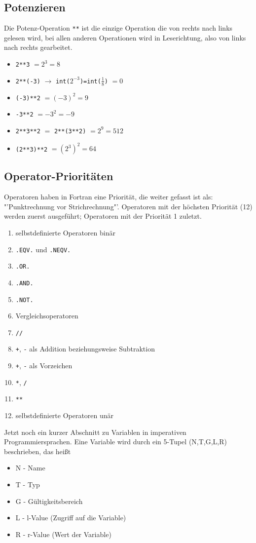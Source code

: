 \subsection{Potenzieren}

Die Potenz-Operation \texttt{**} ist die einzige Operation die von rechts nach links gelesen wird, bei allen anderen Operationen wird in Leserichtung, also von links nach rechts gearbeitet.
\begin{itemize}
	\item\texttt{2**3} $=2^3=8$
	\item\texttt{2**(-3)} $\to$ \texttt{int($2^{-3}$)=int($\frac{1}{8}$)} $=0$
	\item\texttt{(-3)**2} $=(-3)^2=9$
	\item\texttt{-3**2} $=-3^2=-9$
	\item\texttt{2**3**2} $=$ \texttt{2**(3**2)} $=2^9=512$
	\item\texttt{(2**3)**2} $=(2^3)^2=64$
\end{itemize}

\subsection{Operator-Prioritäten}

Operatoren haben in Fortran eine Priorität, die weiter gefasst ist als: "'Punktrechnung vor Strichrechnung"'. Operatoren mit der höchsten Priorität (12) werden zuerst ausgeführt; Operatoren mit der Priorität 1 zuletzt.
\begin{enumerate}
	\item selbstdefinierte Operatoren binär
	\item\texttt{.EQV.} und \texttt{.NEQV.}
	\item\texttt{.OR.}
	\item\texttt{.AND.}
	\item\texttt{.NOT.}
	\item Vergleichsoperatoren
	\item\texttt{//}
	\item\texttt{+}, \texttt{-} als Addition beziehungsweise Subtraktion
	\item\texttt{+}, \texttt{-} als Vorzeichen
	\item\texttt{*}, \texttt{/}
	\item\texttt{**}
	\item selbstdefinierte Operatoren unär
\end{enumerate}

Jetzt noch ein kurzer Abschnitt zu Variablen in imperativen Programmiersprachen. Eine Variable wird durch ein 5-Tupel (N,T,G,L,R) beschrieben, das heißt
\begin{itemize}
	\item N - Name
	\item T - Typ
	\item G - Gültigkeitsbereich
	\item L - l-Value (Zugriff auf die Variable)
	\item R - r-Value (Wert der Variable)
\end{itemize}
